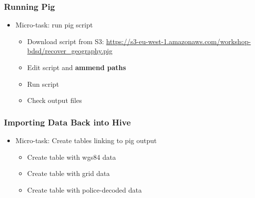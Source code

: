 \documentclass[hyperref={pdfpagelabels=true}]{beamer}
\begin{document}
\begin{frame}
\frametitle{Running Pig}
\begin{itemize}
  \item<1->Micro-task: run pig script
  \begin{itemize}
    \item<2->Download script from S3: \url{https://s3-eu-west-1.amazonaws.com/workshop-bdsd/recover_geography.pig}
    \item<3->Edit script and \textbf{ammend paths}
    \item<4->Run script    
    \item<5->Check output files
  \end{itemize}
\end{itemize}
\end{frame}

\begin{frame}
\frametitle{Importing Data Back into Hive}
\begin{itemize}
  \item<1->Micro-task: Create tables linking to pig output
  \begin{itemize}
    \item<2->Create table with wgs84 data
    \item<2->Create table with grid data
    \item<2->Create table with police-decoded data
  \end{itemize}
\end{itemize}
\end{frame}
\end{document}
